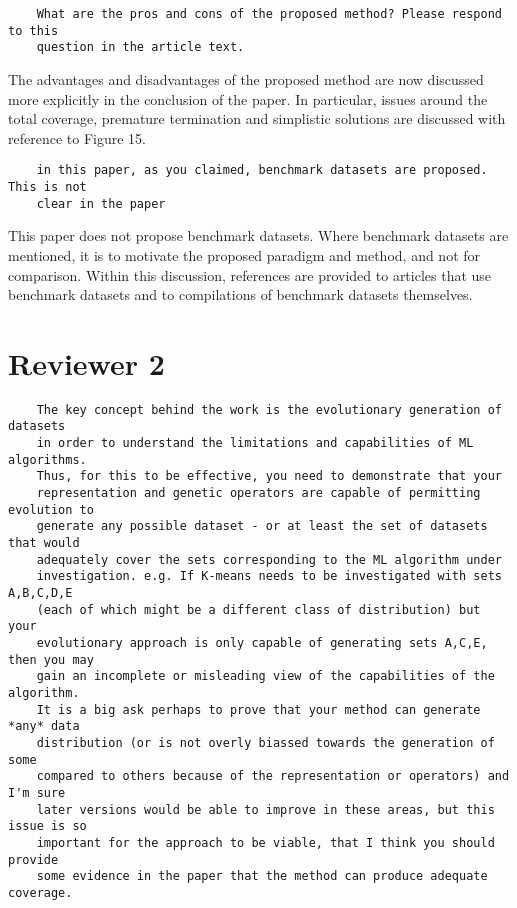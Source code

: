 \documentclass[11pt]{article}
\begin{document}
\begin{tcolorbox}
\begin{verbatim}
    What are the pros and cons of the proposed method? Please respond to this
    question in the article text.
\end{verbatim}
\end{tcolorbox}

The advantages and disadvantages of the proposed method are now discussed more
explicitly in the conclusion of the paper. In particular, issues around the
total coverage, premature termination and simplistic solutions are discussed
with reference to Figure 15.

\begin{tcolorbox}
\begin{verbatim}
    in this paper, as you claimed, benchmark datasets are proposed. This is not
    clear in the paper
\end{verbatim}
\end{tcolorbox}

This paper does not propose benchmark datasets. Where benchmark datasets are
mentioned, it is to motivate the proposed paradigm and method, and not for
comparison. Within this discussion, references are provided to articles that use
benchmark datasets and to compilations of benchmark datasets themselves.


\section*{Reviewer 2}

\begin{tcolorbox}
\begin{verbatim}
    The key concept behind the work is the evolutionary generation of datasets
    in order to understand the limitations and capabilities of ML algorithms.
    Thus, for this to be effective, you need to demonstrate that your
    representation and genetic operators are capable of permitting evolution to
    generate any possible dataset - or at least the set of datasets that would
    adequately cover the sets corresponding to the ML algorithm under
    investigation. e.g. If K-means needs to be investigated with sets A,B,C,D,E
    (each of which might be a different class of distribution) but your
    evolutionary approach is only capable of generating sets A,C,E, then you may
    gain an incomplete or misleading view of the capabilities of the algorithm.
    It is a big ask perhaps to prove that your method can generate *any* data
    distribution (or is not overly biassed towards the generation of some
    compared to others because of the representation or operators) and I'm sure
    later versions would be able to improve in these areas, but this issue is so
    important for the approach to be viable, that I think you should provide
    some evidence in the paper that the method can produce adequate coverage.
\end{verbatim}
\end{tcolorbox}
\end{document}
